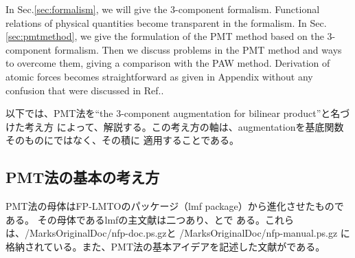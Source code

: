 \documentclass[a4paper,10pt,aip,onecolumn,amsmath,amssymb,floatfix,rmp]{revtex4-1}
\newcommand{\refsec}[1]{\mbox{Sec.~\!\ref{#1}}}
\def\smh{smHankel}
\begin{document}
In Sec.\ref{sec:formalism}, we will give the 3-component formalism.
Functional relations of physical quantities become transparent in the formalism.
In Sec.\ref{sec:pmtmethod}, we give the formulation of the PMT method
based on the 3-component formalism. Then we discuss problems
in the PMT method and ways to overcome them, giving a comparison with the PAW method.
Derivation of atomic forces becomes straightforward as given in Appendix
without any confusion that were discussed in Ref.\cite{soler93}.


以下では、PMT法を``the 3-component augmentation for bilinear product''と名づけた考え方
によって、解説する。この考え方の軸は、augmentationを基底関数そのものにではなく、その積に
適用することである。

\subsection{PMT法の基本の考え方}
PMT法の母体はFP-LMTOのパッケージ（lmf package）から進化させたものである。
その母体であるlmfの主文献は二つあり、\cite{lmfchap}と\cite{nfpmanual}で
ある。これらは、/MarksOriginalDoc/nfp-doc.ps.gzと
/MarksOriginalDoc/nfp-manual.ps.gz
に格納されている。また、PMT法の基本アイデアを記述した文献が\cite{pmt1}である。
\end{document}
